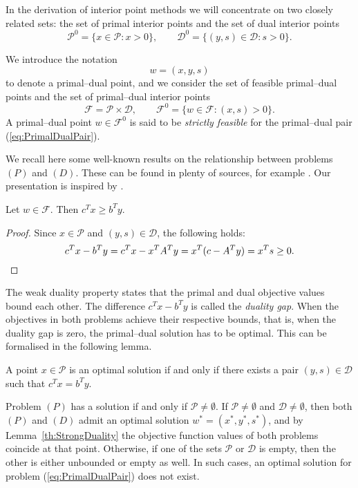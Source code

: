 In the derivation of interior point methods we will concentrate on
two closely related sets: the set of primal interior points and
the set of dual interior points 
\[
\mathcal{P}^0 = \{ x \in \mathcal{P} : x > 0 \}, \qquad
\mathcal{D}^0 = \{ (y,s) \in \mathcal{D} : s > 0 \}.
\]

We introduce the notation
\[
  w = (x,y,s)
\]
to denote a primal--dual point, and
we consider the set of feasible primal--dual points 
and the set of primal--dual interior points
\[
  \mathcal{F} = \mathcal{P} \times \mathcal{D}, \qquad
  \mathcal{F}^0 = \{ w \in \mathcal{F} : (x,s) > 0 \}.
\]
A primal--dual point $w\in\mathcal{F}^0$ is said to be {\em strictly feasible}
for the primal--dual pair (\ref{eq:PrimalDualPair}).

We recall here some well-known results on the relationship between
problems $(P)$ and $(D)$.
These can be found in plenty of sources, for example 
\cite{lp:Chvatal,Schrijver86}.
Our presentation is inspired by 
\cite{GulerRoosTerlakyVial,Megiddo,ipm:Wright97}.

\begin{lemma}
Let $w \in \mathcal{F}$. Then $c^Tx \ge b^Ty$.
\end{lemma}
%
\begin{proof}
Since $x \in \mathcal{P}$ and $(y,s) \in \mathcal{D}$, 
the following holds:
\[
  c^Tx - b^Ty = c^Tx - x^TA^Ty = x^T(c - A^T y) = x^Ts \ge 0. \qedhere
\]
\end{proof}

The weak duality property states that the primal and dual objective
values bound each other.
The difference $c^Tx - b^Ty$ is called the {\em duality gap}.
When the objectives in both problems achieve their respective bounds,
that is, when the duality gap is zero, the primal--dual solution has
to be optimal. This can be formalised
in the following lemma.

\begin{lemma}  \label{th:StrongDuality}
A point $x \in \mathcal{P}$ is an optimal solution if and only if
there exists a pair $(y,s) \in \mathcal{D}$ such that $c^Tx = b^Ty$.
\end{lemma}

Problem $(P)$ has a solution if and only if $\mathcal{P} \ne \emptyset$.
If $\mathcal{P} \ne \emptyset$ and $\mathcal{D} \ne \emptyset$,
then both $(P)$ and $(D)$ admit an
optimal solution $w^* = (x^*, y^*, s^*)$, and by Lemma~\ref{th:StrongDuality}
the objective function 
values of both problems coincide at that point. 
Otherwise, if one of the sets $\mathcal{P}$ or $\mathcal{D}$ is empty, 
then the other is either unbounded or empty as well. 
In such cases, an optimal
solution for problem (\ref{eq:PrimalDualPair}) does not exist.

